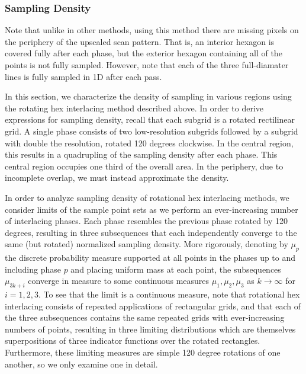 \documentclass{article}
\begin{document}


\subsubsection{Sampling Density}
\label{sec:density}

Note that unlike in other methods, using this method there are missing pixels on the periphery of the upscaled scan pattern.
%
That is, an interior hexagon is covered fully after each phase, but the exterior hexagon containing all of the points is not fully sampled.
%
However, note that each of the three full-diamater lines is fully sampled in 1D after each pass.


In this section, we characterize the density of sampling in various regions using the rotating hex interlacing method described above.
%
In order to derive expressions for sampling density, recall that each subgrid is a rotated rectilinear grid.
%
A single phase consists of two low-resolution subgrids followed by a subgrid with double the resolution, rotated 120 degrees clockwise.
%
In the central region, this results in a quadrupling of the sampling density after each phase.
%
This central region occupies one third of the overall area.
%
In the periphery, due to incomplete overlap, we must instead approximate the density.


In order to analyze sampling density of rotational hex interlacing methods, we
consider limits of the sample point sets as we perform an ever-increasing number
of interlacing phases.
%
Each phase resembles the previous phase rotated by 120 degrees, resulting in
three subsequences that each independently converge to the same (but rotated)
normalized sampling density.
%
More rigorously, denoting by $\mu_p$ the discrete probability measure supported
at all points in the phases up to and including phase $p$ and placing uniform
mass at each point, the subsequences $\mu_{3k+i}$
converge in measure to some continuous measures $\mu_1,\mu_2,\mu_3$ as
$k\to\infty$ for $i=1,2,3$.
%
To see that the limit is a continuous measure, note that rotational hex
interlacing consists of repeated applications of rectangular grids, and that
each of the three subsequences contains the same repeated grids with
ever-increasing numbers of points, resulting in three limiting distributions
which are themselves superpositions of three indicator functions over the
rotated rectangles.
%
Furthermore, these limiting measures are simple 120 degree rotations of one
another, so we only examine one in detail.
\end{document}
